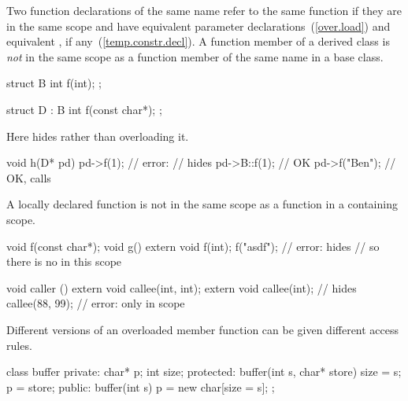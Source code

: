 \pnum
Two function declarations of the same name refer to the same function if they
are in the same scope and have equivalent parameter declarations~(\ref{over.load})
and equivalent , if any~(\ref{temp.constr.decl}).
A function member of a derived class is
\textit{not}
in the same scope as a function member of the same name in a base class.
\begin{example}

\begin{codeblock}
struct B {
  int f(int);
};

struct D : B {
  int f(const char*);
};
\end{codeblock}

%
%
Here
hides
rather than overloading it.

%
\begin{codeblock}
void h(D* pd) {
  pd->f(1);                     // error:
                                //  hides 
  pd->B::f(1);                  // OK
  pd->f("Ben");                 // OK, calls 
}
\end{codeblock}
\end{example}

\pnum
A locally declared function is not in the same scope as a function in
a containing scope.
\begin{example}

\begin{codeblock}
void f(const char*);
void g() {
  extern void f(int);
  f("asdf");                    // error:  hides 
                                // so there is no  in this scope
}

void caller () {
  extern void callee(int, int);
  {
    extern void callee(int);    // hides 
    callee(88, 99);             // error: only  in scope
  }
}
\end{codeblock}
\end{example}

\pnum
{}%
%
Different versions of an overloaded member function can be given different
access rules.
\begin{example}

\begin{codeblock}
class buffer {
private:
    char* p;
    int size;
protected:
    buffer(int s, char* store) { size = s; p = store; }
public:
    buffer(int s) { p = new char[size = s]; }
};
\end{codeblock}
\end{example}

